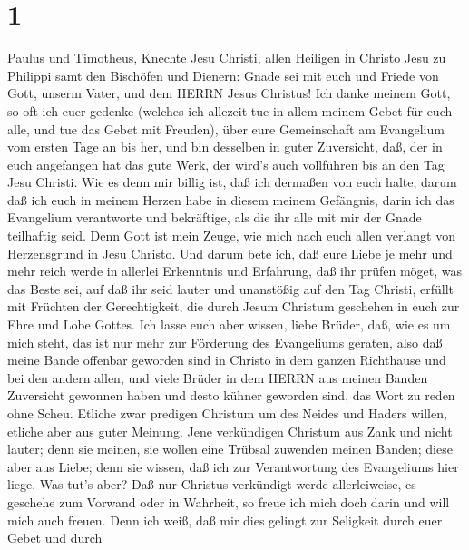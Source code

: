 \hypertarget{section}{%
\section{1}\label{section}}

 Paulus und Timotheus, Knechte Jesu Christi, allen Heiligen
in Christo Jesu zu Philippi samt den Bischöfen und Dienern: 
Gnade sei mit euch und Friede von Gott, unserm Vater, und dem HERRN
Jesus Christus!  Ich danke meinem Gott, so oft ich euer
gedenke  (welches ich allezeit tue in allem meinem Gebet für
euch alle, und tue das Gebet mit Freuden),  über eure
Gemeinschaft am Evangelium vom ersten Tage an bis her,  und
bin desselben in guter Zuversicht, daß, der in euch angefangen hat das
gute Werk, der wird's auch vollführen bis an den Tag Jesu Christi.
 Wie es denn mir billig ist, daß ich dermaßen von euch
halte, darum daß ich euch in meinem Herzen habe in diesem meinem
Gefängnis, darin ich das Evangelium verantworte und bekräftige, als die
ihr alle mit mir der Gnade teilhaftig seid.  Denn Gott ist
mein Zeuge, wie mich nach euch allen verlangt von Herzensgrund in Jesu
Christo.  Und darum bete ich, daß eure Liebe je mehr und
mehr reich werde in allerlei Erkenntnis und Erfahrung,  daß
ihr prüfen möget, was das Beste sei, auf daß ihr seid lauter und
unanstößig auf den Tag Christi,  erfüllt mit Früchten der
Gerechtigkeit, die durch Jesum Christum geschehen in euch zur Ehre und
Lobe Gottes.  Ich lasse euch aber wissen, liebe Brüder,
daß, wie es um mich steht, das ist nur mehr zur Förderung des
Evangeliums geraten,  also daß meine Bande offenbar
geworden sind in Christo in dem ganzen Richthause und bei den andern
allen,  und viele Brüder in dem HERRN aus meinen Banden
Zuversicht gewonnen haben und desto kühner geworden sind, das Wort zu
reden ohne Scheu.  Etliche zwar predigen Christum um des
Neides und Haders willen, etliche aber aus guter Meinung. 
Jene verkündigen Christum aus Zank und nicht lauter; denn sie meinen,
sie wollen eine Trübsal zuwenden meinen Banden;  diese aber
aus Liebe; denn sie wissen, daß ich zur Verantwortung des Evangeliums
hier liege.  Was tut's aber? Daß nur Christus verkündigt
werde allerleiweise, es geschehe zum Vorwand oder in Wahrheit, so freue
ich mich doch darin und will mich auch freuen.  Denn ich
weiß, daß mir dies gelingt zur Seligkeit durch euer Gebet und durch
